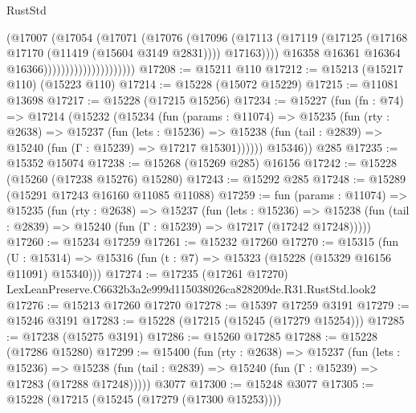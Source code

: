 \begin{lexlean}{RustStd}
\begin{coremodule}
                                        (@17007
                                          (@17054
                                            (@17071
                                              (@17076
                                                (@17096
                                                  (@17113
                                                    (@17119
                                                      (@17125
                                                        (@17168
                                                          @17170
                                                          (@11419 (@15604 @3149 @2831))))
                                                      @17163))))
                                              @16358
                                              @16361
                                              @16364
                                              @16366)))))))))))))))))))))
@17208 := @15211 @110
@17212 := @15213 (@15217 @110) (@15223 @110)
@17214 := @15228 (@15072 @15229)
@17215 := @11081 @13698
@17217 := @15228 (@17215 @15256)
@17234 := @15227
    (fun (fn : @74) =>
    @17214
      (@15232
        (@15234
          (fun (params : @11074) =>
          @15235
            (fun (rty : @2638) =>
            @15237
              (fun (lets : @15236) =>
              @15238 (fun (tail : @2839) => @15240 (fun (Γ : @15239) => @17217 @15301))))))
        @15346))
    @285
@17235 := @15352 @15074
@17238 := @15268 (@15269 @285) @16156
@17242 := @15228 (@15260 (@17238 @15276) @15280)
@17243 := @15292 @285
@17248 := @15289 (@15291 @17243 @16160 @11085 @11088)
@17259 := fun (params : @11074) =>
  @15235
    (fun (rty : @2638) =>
    @15237
      (fun (lets : @15236) =>
      @15238 (fun (tail : @2839) => @15240 (fun (Γ : @15239) => @17217 (@17242 @17248)))))
@17260 := @15234 @17259
@17261 := @15232 @17260
@17270 := @15315
    (fun (U : @15314) => @15316 (fun (t : @7) => @15323 (@15228 (@15329 @16156 @11091) @15340)))
@17274 := @17235 (@17261 @17270) LexLeanPreserve.C6632b3a2e999d115038026ca828209de.R31.RustStd.look2
@17276 := @15213 @17260 @17270
@17278 := @15397 @17259 @3191
@17279 := @15246 @3191
@17283 := @15228 (@17215 (@15245 (@17279 @15254)))
@17285 := @17238 (@15275 @3191)
@17286 := @15260 @17285
@17288 := @15228 (@17286 @15280)
@17299 := @15400
    (fun (rty : @2638) =>
    @15237
      (fun (lets : @15236) =>
      @15238 (fun (tail : @2839) => @15240 (fun (Γ : @15239) => @17283 (@17288 @17248)))))
    @3077
@17300 := @15248 @3077
@17305 := @15228 (@17215 (@15245 (@17279 (@17300 @15253))))

\end{coremodule}
\end{lexlean}
